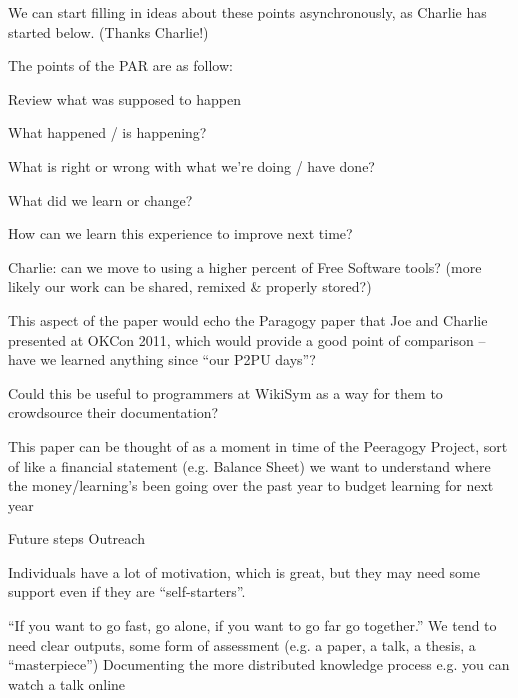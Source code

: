 \documentclass{acm_proc_article-sp}
\begin{document}
            We can start filling in ideas about these points asynchronously, as Charlie has started below. (Thanks Charlie!)

        The points of the PAR are as follow:

            Review what was supposed to happen

            What happened / is happening?

            What is right or wrong with what we're doing / have done?

            What did we learn or change?

            How can we learn this experience to improve next time?

                Charlie: can we move to using a higher percent of Free Software tools? (more likely our work can be shared, remixed \& properly stored?)

        This aspect of the paper would echo the Paragogy paper that Joe and Charlie presented at OKCon 2011, which would provide a good point of comparison -- have we learned anything since ``our P2PU days''?

Could this be useful to programmers at WikiSym as a way for them to crowdsource their documentation?

This paper can be thought of as a moment in time of the Peeragogy Project, sort of like a financial statement (e.g. Balance Sheet) we want to understand where the money/learning's been going over the past year to budget learning for next year

Future steps
Outreach

Individuals have a lot of motivation, which is great, but they may need some support even if they are ``self-starters''.

``If you want to go fast, go alone, if you want to go far go together.''
We tend to need clear outputs, some form of assessment (e.g. a paper,
a talk, a thesis, a ``masterpiece'')
Documenting the more distributed knowledge process
e.g. you can watch a talk online

%

\end{document}
